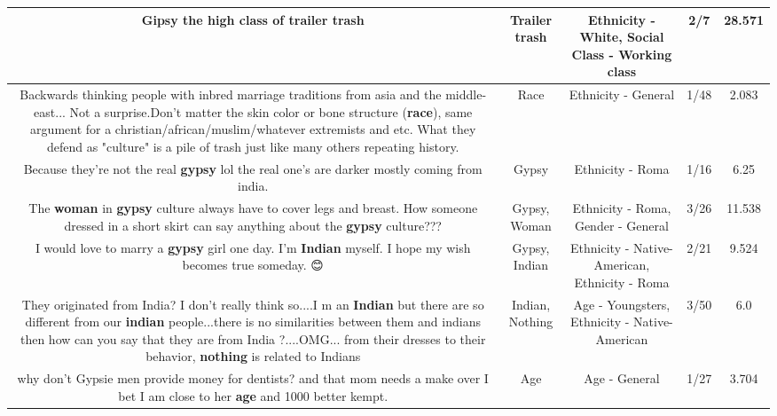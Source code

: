 \documentclass[11pt]{article}
\newlength\mylength
\begin{document}
\begin{center}
\begin{longtable}{|C{.65\mylength}|C{.30\mylength}|C{.12\mylength}|C{.12\mylength}|C{.12\mylength}|}
  \small Gipsy the high class of trailer trash\normalsize   & Trailer trash & Ethnicity - White, Social Class - Working class & 2/7 & 28.571 \\  \hline
  \small Backwards thinking people with inbred marriage traditions from asia and the middle-east... Not a surprise.Don't matter the skin color or bone structure (\textbf{race}), same argument for a christian/african/muslim/whatever extremists and etc. What they defend as "culture" is a pile of trash just like many others repeating history.\normalsize   & Race & Ethnicity - General & 1/48 & 2.083 \\  \hline
  \small Because they're not the real \textbf{gypsy} lol the real one's are darker mostly coming from india.\normalsize   & Gypsy & Ethnicity - Roma & 1/16 & 6.25 \\  \hline
  \small The \textbf{woman} in \textbf{gypsy} culture always have to cover legs and breast. How someone dressed in a short skirt can say anything about the \textbf{gypsy} culture???\normalsize   & Gypsy, Woman & Ethnicity - Roma, Gender - General & 3/26 & 11.538 \\  \hline
  \small I would love to marry a \textbf{gypsy} girl one day. I'm \textbf{Indian} myself. I hope my wish becomes true someday. 😊\normalsize   & Gypsy, Indian & Ethnicity - Native-American, Ethnicity - Roma & 2/21 & 9.524 \\  \hline
  \small They originated from India?  I don't really think so....I m an \textbf{Indian} but there are so different from our \textbf{indian} people...there is no similarities between them and indians then how can you say that they are from India ?....OMG... from their dresses to their behavior, \textbf{nothing} is related to Indians\normalsize   & Indian, Nothing & Age - Youngsters, Ethnicity - Native-American & 3/50 & 6.0 \\  \hline
  \small why don't Gypsie men provide money for dentists? and that mom needs a make over I bet I am close to her \textbf{age} and 1000 better kempt.\normalsize   & Age & Age - General & 1/27 & 3.704 \\  \hline

\end{longtable}
\end{center}
\end{document}
